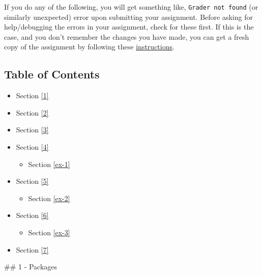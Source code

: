 \documentclass[11pt]{article}
\providecommand{\tightlist}{%
      \setlength{\itemsep}{0pt}\setlength{\parskip}{0pt}}
\begin{document}
If you do any of the following, you will get something like,
\texttt{Grader\ not\ found} (or similarly unexpected) error upon
submitting your assignment. Before asking for help/debugging the errors
in your assignment, check for these first. If this is the case, and you
don't remember the changes you have made, you can get a fresh copy of
the assignment by following these
\href{https://www.coursera.org/learn/deep-neural-network/supplement/QWEnZ/h-ow-to-refresh-your-workspace}{instructions}.

    \hypertarget{table-of-contents}{%
\subsection{Table of Contents}\label{table-of-contents}}

\begin{itemize}
\tightlist
\item
  Section \ref{1}
\item
  Section \ref{2}
\item
  Section \ref{3}
\item
  Section \ref{4}

  \begin{itemize}
  \tightlist
  \item
    Section \ref{ex-1}
  \end{itemize}
\item
  Section \ref{5}

  \begin{itemize}
  \tightlist
  \item
    Section \ref{ex-2}
  \end{itemize}
\item
  Section \ref{6}

  \begin{itemize}
  \tightlist
  \item
    Section \ref{ex-3}
  \end{itemize}
\item
  Section \ref{7}
\end{itemize}

    \#\# 1 - Packages
\end{document}

